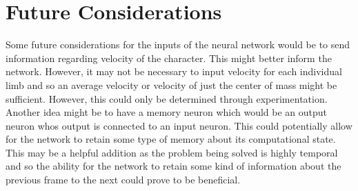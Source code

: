 \documentclass[letterpaper]{article} %
\begin{document}
\section{Future Considerations}
Some future considerations for the inputs of the neural network would be to send information regarding velocity of the character.
This might better inform the network.
However, it may not be necessary to input velocity for each individual limb and so an average velocity or velocity of just the center of mass might be sufficient.
However, this could only be determined through experimentation.
\indent Another idea might be to have a memory neuron which would be an output neuron whos output is connected to an input neuron.
This could potentially allow for the network to retain some type of memory about its computational state.
This may be a helpful addition as the problem being solved is highly temporal and so the ability for the network to retain some kind of information about the previous frame to the next could prove to be beneficial.
\end{document}
